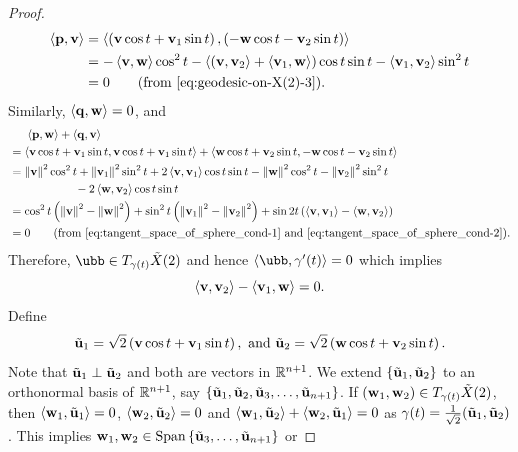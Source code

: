 \begin{proof}
	\begin{align*}
		\left\langle \mathbf{p}, \mathbf{v} \right\rangle & = \left\langle \left(\mathbf{v} \cos t+\mathbf{v}_1\sin t\right), \left(-\mathbf{w} \cos t-\mathbf{v}_2\sin t\right) \right\rangle 
		\\
		& = - \left\langle \mathbf{v}, \mathbf{w} \right\rangle\cos^2t-\left\langle \left(\mathbf{v},\mathbf{v}_2 \right\rangle + \left\langle \mathbf{v}_1, \mathbf{w} \right\rangle \right) \cos t \sin t - \left\langle \mathbf{v}_1, \mathbf{v}_2 \right\rangle\sin^2t 
		\\
		& = 0 \qquad (\text{from \eqref{eq:geodesic-on-X(2)-3}}).
	\end{align*}
	Similarly, $\left\langle \mathbf{q}, \mathbf{w} \right\rangle=0$, and 
	\begin{align*}
		& \kern 0.5cm \left\langle \mathbf{p}, \mathbf{w} \right\rangle + \left\langle \mathbf{q}, \mathbf{v} \right\rangle \\
        & = \left\langle \mathbf{v} \cos t+\mathbf{v}_1\sin t, \mathbf{v}\cos t+\mathbf{v}_1\sin t  \right\rangle + \left\langle \mathbf{w}\cos t+\mathbf{v}_2\sin t, -\mathbf{w}\cos t-\mathbf{v}_2\sin t \right\rangle 
		\\
		& = \left\|\mathbf{v}\right\|^2\cos^2t + \left\|\mathbf{v}_1\right\|^2\sin^2t + 2 \left\langle \mathbf{v},\mathbf{v}_1\right\rangle\cos t\sin t - \left\|\mathbf{w}\right\|^2\cos^2t-\left\|\mathbf{v}_2\right\|^2\sin^2t 
		\\ 
		& \kern 2cm - 2 \left\langle \mathbf{w}, \mathbf{v}_2 \right\rangle\cos t \sin t  
		\\ 
		& = \cos^2t \left(\left\|\mathbf{v}\right\|^2-\left\|\mathbf{w}\right\|^2\right)+ \sin^2t \left(\left\|\mathbf{v}_1\right\|^2-\left\|\mathbf{v}_2\right\|^2\right) + \sin 2t \left(\left\langle \mathbf{v},\mathbf{v}_1 \right\rangle - \left\langle \mathbf{w},\mathbf{v}_2 \right\rangle\right) 
		\\ 
		& = 0 \qquad (\text{from \eqref{eq:tangent_space_of_sphere_cond-1} and \eqref{eq:tangent_space_of_sphere_cond-2}}). 
	\end{align*}
	Therefore, $\ubb\in T_{\gamma(t)}\tilde{X}(2)$ and hence $\left\langle \ubb, \gamma'(t) \right\rangle = 0$ which implies 
	\begin{equation}
		\left\langle \mathbf{v},\mathbf{v}_2 \right\rangle - \left\langle \mathbf{v}_1,\mathbf{w} \right\rangle = 0 \label{eq:perp-cond}.
	\end{equation}
	Define 
	\begin{displaymath}
		\tilde{\mathbf{u}}_1 = \sqrt{2} \left(\mathbf{v}\cos t+\mathbf{v}_1\sin t\right),\text{ and } \tilde{\mathbf{u}}_2 = \sqrt{2} \left(\mathbf{w}\cos t+\mathbf{v}_2\sin t\right).
	\end{displaymath}
	Note that $\tilde{\mathbf{u}}_1\perp \tilde{\mathbf{u}}_2$ and both are vectors in $\mathbb{R}^{n+1}$. We extend $\left\{\tilde{\mathbf{u}}_1,\tilde{\mathbf{u}}_2\right\}$ to an orthonormal basis of $\mathbb{R}^{n+1}$, say $\left\{\tilde{\mathbf{u}}_1,\tilde{\mathbf{u}}_2, \tilde{\mathbf{u}}_3,\ldots,\tilde{\mathbf{u}}_{n+1}\right\}$. If $\left(\mathbf{w}_1,\mathbf{w}_2\right)\in T_{\gamma(t)}\tilde{X}(2)$, then $\left\langle \mathbf{w}_1,\tilde{\mathbf{u}}_1 \right\rangle=0$, $\left\langle \mathbf{w}_2,\tilde{\mathbf{u}}_2 \right\rangle=0$ and $\left\langle \mathbf{w}_1,\tilde{\mathbf{u}}_2 \right\rangle+\left\langle \mathbf{w}_2,\tilde{\mathbf{u}}_1 \right\rangle=0$ as $\gamma(t) = \frac{1}{\sqrt{2}}(\tilde{\mathbf{u}}_1,\tilde{\mathbf{u}}_2)$. This implies $\mathbf{w}_1,\mathbf{w}_2\in \operatorname{Span}\left\{\tilde{\mathbf{u}}_3,\ldots,\tilde{\mathbf{u}}_{n+1}\right\}$ or 

\end{proof}

